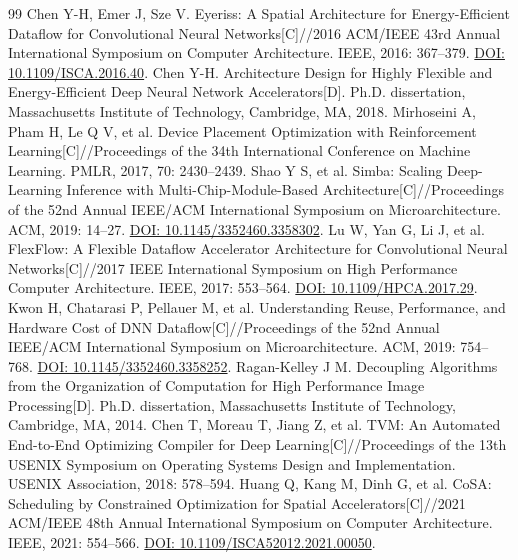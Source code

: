 \ifcontest\fi
\begin{thebibliography}{99}
 Chen Y-H, Emer J, Sze V. Eyeriss: A Spatial Architecture for Energy-Efficient Dataflow for Convolutional Neural Networks[C]//2016 ACM/IEEE 43rd Annual International Symposium on Computer Architecture. IEEE, 2016: 367--379. \href{https://doi.org/10.1109/ISCA.2016.40}{DOI: 10.1109/ISCA.2016.40}.
 Chen Y-H. Architecture Design for Highly Flexible and Energy-Efficient Deep Neural Network Accelerators[D]. Ph.D. dissertation, Massachusetts Institute of Technology, Cambridge, MA, 2018.
 Mirhoseini A, Pham H, Le Q V, et al. Device Placement Optimization with Reinforcement Learning[C]//Proceedings of the 34th International Conference on Machine Learning. PMLR, 2017, 70: 2430--2439.
 Shao Y S, et al. Simba: Scaling Deep-Learning Inference with Multi-Chip-Module-Based Architecture[C]//Proceedings of the 52nd Annual IEEE/ACM International Symposium on Microarchitecture. ACM, 2019: 14--27. \href{https://doi.org/10.1145/3352460.3358302}{DOI: 10.1145/3352460.3358302}.
 Lu W, Yan G, Li J, et al. FlexFlow: A Flexible Dataflow Accelerator Architecture for Convolutional Neural Networks[C]//2017 IEEE International Symposium on High Performance Computer Architecture. IEEE, 2017: 553--564. \href{https://doi.org/10.1109/HPCA.2017.29}{DOI: 10.1109/HPCA.2017.29}.
 Kwon H, Chatarasi P, Pellauer M, et al. Understanding Reuse, Performance, and Hardware Cost of DNN Dataflow[C]//Proceedings of the 52nd Annual IEEE/ACM International Symposium on Microarchitecture. ACM, 2019: 754--768. \href{https://doi.org/10.1145/3352460.3358252}{DOI: 10.1145/3352460.3358252}.
 Ragan-Kelley J M. Decoupling Algorithms from the Organization of Computation for High Performance Image Processing[D]. Ph.D. dissertation, Massachusetts Institute of Technology, Cambridge, MA, 2014.
 Chen T, Moreau T, Jiang Z, et al. TVM: An Automated End-to-End Optimizing Compiler for Deep Learning[C]//Proceedings of the 13th USENIX Symposium on Operating Systems Design and Implementation. USENIX Association, 2018: 578--594.
 Huang Q, Kang M, Dinh G, et al. CoSA: Scheduling by Constrained Optimization for Spatial Accelerators[C]//2021 ACM/IEEE 48th Annual International Symposium on Computer Architecture. IEEE, 2021: 554--566. \href{https://doi.org/10.1109/ISCA52012.2021.00050}{DOI: 10.1109/ISCA52012.2021.00050}.

\end{thebibliography}
